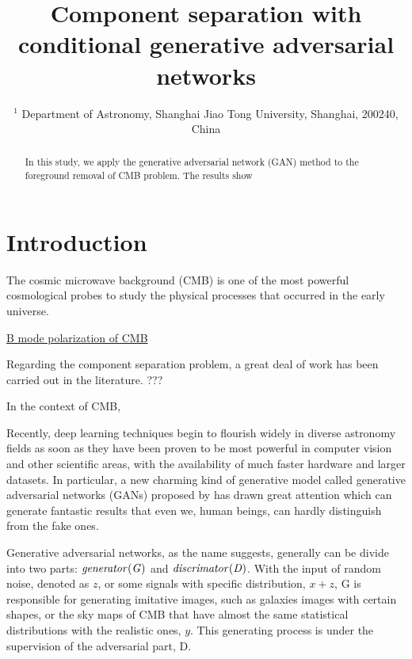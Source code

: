 \documentclass[floatfix]{emulateapj}
\begin{document}
\title{{Component separation with conditional generative adversarial networks}}
\author{
$^{1}$ Department of Astronomy, Shanghai Jiao Tong University, Shanghai, 200240, China\\}
\begin{abstract}
In this study, we apply the generative adversarial network (GAN) method to the foreground removal of CMB problem. The results show


\end{abstract}


\maketitle


\section{Introduction}
The cosmic microwave background (CMB) is one of the most powerful cosmological probes to study the physical processes that occurred in the early universe. 

\underline{B mode polarization of CMB}

Regarding the component separation problem, a great deal of work has been carried out in the literature. ???

In the context of CMB, 

Recently, deep learning techniques begin to flourish widely in diverse astronomy fields as soon as they have been proven to be most powerful in computer vision and other scientific areas, with the availability of much faster hardware and larger datasets. In particular, a new charming kind of generative model called generative adversarial networks (GANs) proposed by \cite{2014arXiv1406.2661G} has drawn great attention which can generate fantastic results that even we, human beings, can hardly distinguish from the fake ones.

Generative adversarial networks, as the name suggests, generally can be divide into two parts: $\it{generator}(G)$ and $\it{discrimator}(D)$. With the input of random noise, denoted as $z$, or some signals with  specific distribution, $x + z$, G is responsible for generating imitative images, such as galaxies images with certain shapes, or the sky maps of CMB that have almost the same statistical distributions with the realistic ones, $y$. This generating process is under the supervision of the adversarial part, D. 
\end{document}
